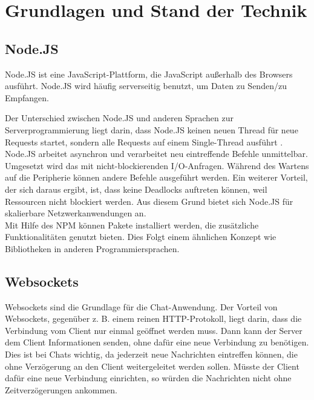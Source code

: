 
\chapter{Grundlagen und Stand der Technik}\label{cha:Grundlagen}
\section{Node.JS}\label{sec:Node.JS}
Node.JS ist eine JavaScript-Plattform, die JavaScript außerhalb des Browsers ausführt. Node.JS wird häufig serverseitig benutzt, um Daten zu Senden/zu Empfangen. \cite[vgl.][]{Node.2019}

Der Unterschied zwischen Node.JS und anderen Sprachen zur Serverprogrammierung liegt darin, dass Node.JS keinen neuen Thread für neue Requests startet, sondern alle Requests auf einem Single-Thread ausführt \cite[vgl.][3]{Holmes.2013}. Node.JS arbeitet asynchron und verarbeitet neu eintreffende Befehle unmittelbar. Umgesetzt wird das mit nicht-blockierenden I/O-Anfragen. Während des Wartens auf die Peripherie können andere Befehle ausgeführt werden. Ein weiterer Vorteil, der sich daraus ergibt, ist, dass keine Deadlocks auftreten können, weil Ressourcen nicht blockiert werden. Aus diesem Grund bietet sich Node.JS für skalierbare Netzwerkanwendungen an. \cite[vgl.][4]{Holmes.2013}\\
Mit Hilfe des \acf{NPM} können Pakete installiert werden, die zusätzliche Funktionalitäten genutzt bieten. Dies Folgt einem ähnlichen Konzept wie Bibliotheken in anderen Programmiersprachen.

\section{Websockets}\label{sec:Websockets}
Websockets sind die Grundlage für die Chat-Anwendung. Der Vorteil von Websockets, gegenüber z. B. einem reinen \ac{HTTP}-Protokoll, liegt darin, dass die Verbindung vom Client nur einmal geöffnet werden muss. Dann kann der Server dem Client Informationen senden, ohne dafür eine neue Verbindung zu benötigen. Dies ist bei Chats wichtig, da jederzeit neue Nachrichten eintreffen können, die ohne Verzögerung an den Client weitergeleitet werden sollen. Müsste der Client dafür eine neue Verbindung einrichten, so würden die Nachrichten nicht ohne Zeitverzögerungen ankommen.

